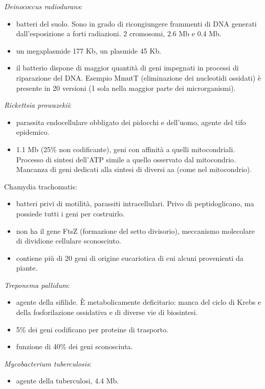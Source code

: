 \begin{multicols}{2}
\begin{itemize}
\end{itemize}
\textit{Deinococcus radiodurans}:
\begin{itemize}
    \item batteri del suolo. 
	Sono in grado di ricongiungere frammenti di DNA generati dall'esposizione a forti radiazioni. 
	2 cromosomi, 2.6 Mb e 0.4 Mb.
    \item un megaplasmide 177 Kb, un plasmide 45 Kb.
    \item il batterio dispone di maggior quantit\`a di geni impegnati in processi di riparazione del DNA. 
	Esempio MmutT (eliminazione dei nucleotidi ossidati) \`e presente in 20 versioni (1 sola nella maggior parte dei microrganismi).
\end{itemize}
\textit{Rickettsia prowazekii}:
\begin{itemize}
    \item parassita endocellulare obbligato dei pidocchi e dell'uomo, agente del tifo epidemico. 
    \item 1.1 Mb (25$\%$ non codificante), geni con affinit\`a a quelli mitocondriali. 
	Processo di sintesi dell'ATP simile a quello osservato dal mitocondrio. 
	Mancanza di geni dedicati alla sintesi di diversi aa (come nel mitocondrio).
\end{itemize}
\textit{}{Chamydia trachomatis}:
\begin{itemize}
    \item batteri privi di motilit\`a, parassiti intracellulari. 
	Privo di peptidoglicano, ma possiede tutti i geni per costruirlo.
    \item non ha il gene FtsZ (formazione del setto divisorio), meccanismo molecolare di dividione cellulare sconosciuto.
    \item contiene pi\`u di 20 geni di origine eucariotica di cui alcuni provenienti da piante.
\end{itemize}
\textit{Treponema pallidum}:
\begin{itemize}
    \item agente della sifilide. 
\`E metabolicamente deficitario: manca del ciclo di Krebs e della fosforilazione ossidativa e di diverse vie di biosintesi.
    \item 5$\%$ dei geni codificano per proteine di trasporto.
    \item funzione di 40$\%$ dei geni sconosciuta. 
\end{itemize}
\textit{Mycobacterium tuberculosis}:
\begin{itemize}
    \item agente della tuberculosi, 4.4 Mb.

\end{itemize}
\end{multicols}
